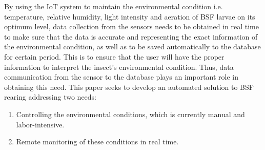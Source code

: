 \documentclass[conference]{IEEEtran}
\begin{document}
By using the IoT system to maintain the environmental condition i.e. temperature, relative humidity, light intensity and aeration of BSF larvae on its optimum level, data collection from the sensors needs to be obtained in real time to make sure that the data is accurate and representing the exact information of the environmental condition, as well as to be saved automatically to the database for certain period. This is to ensure that the user will have the proper information to interpret the insect’s environmental condition. Thus, data communication from the sensor to the database plays an important role in obtaining this need. 
This paper seeks to develop an automated solution to BSF rearing addressing two needs:
\begin{enumerate}
\item Controlling the environmental conditions, which is currently manual and labor-intensive. 
\item Remote monitoring of these conditions in real time.
\end{enumerate}
\end{document}
